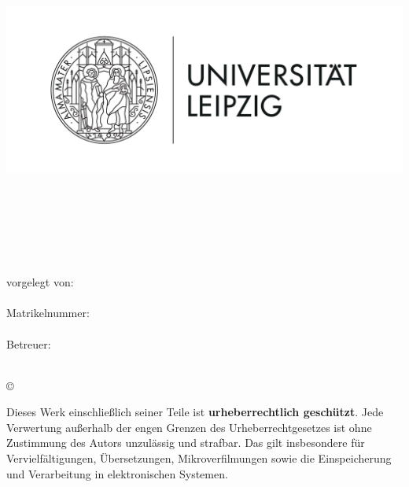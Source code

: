 \thispagestyle{plain}
\begin{titlepage}

\begin{center}
\includegraphics[height=7cm]{Bilder/Uni-L.png}\\[2.5ex]

\institut\\
\fakultaet\\
\fachgebiet\\[6ex]

\textbf{\large\titel}\\[1.5ex]
\art\\[6ex]

\normalsize
vorgelegt von:\\
\autor\\[1.5ex]
Matrikelnummer:\\
\matrikelnr\\[1.5ex]
Betreuer:\\
\erstbetreuer\\
\end{center}


\begin{center}
\copyright\ \jahr\\[1.0ex]
\end{center}

\singlespacing
\small
\noindent Dieses Werk einschließlich seiner Teile ist \textbf{urheberrechtlich geschützt}. Jede Verwertung außerhalb der engen Grenzen des Urheberrechtgesetzes ist ohne Zustimmung des Autors unzulässig und strafbar. Das gilt insbesondere für Vervielfältigungen, Übersetzungen, Mikroverfilmungen sowie die Einspeicherung und Verarbeitung in elektronischen Systemen.

\end{titlepage}
